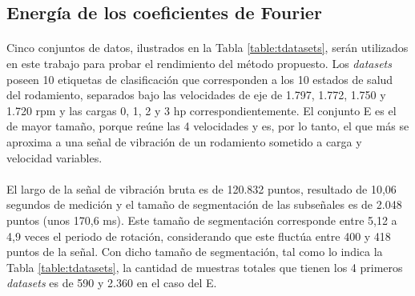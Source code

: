 \documentclass[12pt]{article}
\begin{document}
\subsection{Energía de los coeficientes de Fourier}
\label{sec:datasets}

\paragraph{}
Cinco conjuntos de datos, ilustrados en la Tabla \ref{table:tdatasets}, serán utilizados en este trabajo para probar el rendimiento del método propuesto. Los \textit{datasets} poseen 10 etiquetas de clasificación que corresponden a los 10 estados de salud del rodamiento, separados bajo las velocidades de eje de 1.797, 1.772, 1.750 y 1.720 rpm y las cargas 0, 1, 2 y 3 hp correspondientemente. El conjunto E es el de mayor tamaño, porque reúne las 4 velocidades y es, por lo tanto, el que más se aproxima a una señal de vibración de un rodamiento sometido a carga y velocidad variables.

\paragraph{}
El largo de la señal de vibración bruta es de 120.832 puntos, resultado de 10,06 segundos de medición y el tamaño de segmentación de las subseñales es de 2.048 puntos (unos 170,6 ms). Este tamaño de segmentación corresponde entre 5,12 a 4,9 veces el periodo de rotación, considerando que este fluctúa entre 400 y 418 puntos de la señal. Con dicho tamaño de segmentación, tal como lo indica la Tabla \ref{table:tdatasets}, la cantidad de muestras totales que tienen los 4 primeros \textit{datasets} es de 590 y 2.360 en el caso del E.

\begin{table}
\caption{Descripción de los 5 \textit{datasets}.}
\label{table:tdatasets}
\end{table}
\end{document}
